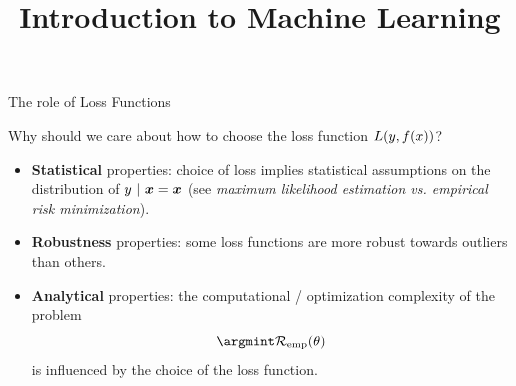 





\usepackage{booktabs}

\newcommand{\titlefigure}{figure_man/vgg_example.png}
\newcommand{\learninggoals}{
  \item Know the concept of robustness 
  \item Learn about analytical and computational properties of loss functions 
  \item Understand that the loss function may influence convergence of the optimizer
}

\title{Introduction to Machine Learning}
\date{}






\begin{vbframe}{The role of Loss Functions}

Why should we care about how to choose the loss function $L(y, f(x))$?

\begin{itemize}
\item \textbf{Statistical} properties: choice of loss implies statistical assumptions on the distribution of $y ~|~ \bm{x} = \bm{x}$ (see \emph{maximum likelihood estimation vs.
empirical risk minimization}). 
\item \textbf{Robustness} properties: some loss functions are more robust towards outliers than others. 
\item \textbf{Analytical} properties: the computational / optimization complexity of the problem 
$$
\argmint \risket
$$
is influenced by the choice of the loss function. 
\end{itemize}

\end{vbframe}

